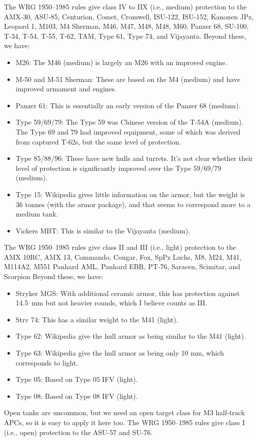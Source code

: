 {    
    The WRG 1950--1985 rules give class IV to IIX (i.e., medium) protection to the
    AMX-30,
    ASU-85,
    Centurion,
    Comet,
    Cromwell,
    ISU-122,
    ISU-152,
    Kanonen JPz,
    Leopard 1,
    M103,
    M4 Sherman,
    M46,
    M47,
    M48,
    M48,
    M60,
    Panzer 68,
    SU-100,
    T-34,
    T-54,
    T-55,
    T-62,
    TAM,
    Type 61,
    Type 74, and
    Vijayanta.
    Beyond these, we have:
    \begin{itemize}
        \item M26: The M46 (medium) is largely an M26 with an improved engine.
        \item M-50 and M-51 Sherman: These are based on the M4 (medium) and have improved armament and engines.
        \item Panzer 61: This is essentially an early version of the Panzer 68 (medium).
        \item Type 59/69/79: The Type 59 was Chinese version of the T-54A (medium). The Type 69 and 79 had improved equipment, some of which was derived from captured T-62s, but the same level of protection.
        \item Type 85/88/96: These have new hulls and turrets. It's not clear whether their level of protection is significantly improved over the Type 59/69/79 (medium).
        \item Type 15: Wikipedia gives little information on the armor, but the weight is 36 tonnes (with the armor package), and that seems to correspond more to a medium tank.
        \item Vickers MBT: This is similar to the  Vijayanta (medium).
    \end{itemize}
    The WRG 1950--1985 rules give class II and III (i.e., light) protection to the
    AMX 10RC,
    AMX 13,
    Commando,
    Cougar,
    Fox,
    SpPz Luchs,
    M8,
    M24,
    M41,
    M114A2,
    M551
    Panhard AML,
    Panhard EBR,
    PT-76,
    Saracen,
    Scimitar, and
    Scorpion
    Beyond these, we have:
    \begin{itemize}
        \item Stryker MGS: With additional ceramic armor, this has protection against 14.5~mm but not heavier rounds, which I believe counts as III.
        \item Strv 74: This has a similar weight to the M41 (light).
        \item Type 62: Wikipedia give the hull armor as being similar to the M41 (light).
        \item Type 63: Wikipedia give the hull armor as being only 10 mm, which corresponds to light.
        \item Type 05: Based on Type 05 IFV (light).
        \item Type 08: Based on Type 08 IFV (light).
    \end{itemize}
    Open tanks are uncommon, but we need an open target class for M3 half-track APCs, so it is easy to apply it here too. The WRG 1950--1985 rules give class I (i.e., open) protection to the
    ASU-57 and
    SU-76.
}

